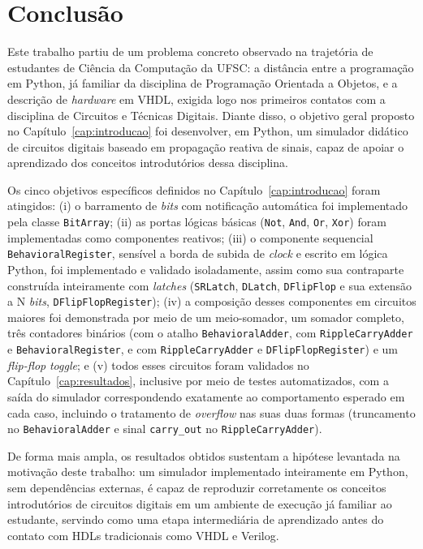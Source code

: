 \chapter{Conclusão}
\label{cap:conclusao}

Este trabalho partiu de um problema concreto observado na trajetória de estudantes de Ciência da Computação da UFSC: a distância entre a programação em Python, já familiar da disciplina de Programação Orientada a Objetos, e a descrição de \textit{hardware} em VHDL, exigida logo nos primeiros contatos com a disciplina de Circuitos e Técnicas Digitais. Diante disso, o objetivo geral proposto no Capítulo~\ref{cap:introducao} foi desenvolver, em Python, um simulador didático de circuitos digitais baseado em propagação reativa de sinais, capaz de apoiar o aprendizado dos conceitos introdutórios dessa disciplina.

Os cinco objetivos específicos definidos no Capítulo~\ref{cap:introducao} foram atingidos: (i) o barramento de \textit{bits} com notificação automática foi implementado pela classe \texttt{BitArray}; (ii) as portas lógicas básicas (\texttt{Not}, \texttt{And}, \texttt{Or}, \texttt{Xor}) foram implementadas como componentes reativos; (iii) o componente sequencial \texttt{BehavioralRegister}, sensível a borda de subida de \textit{clock} e escrito em lógica Python, foi implementado e validado isoladamente, assim como sua contraparte construída inteiramente com \textit{latches} (\texttt{SRLatch}, \texttt{DLatch}, \texttt{DFlipFlop} e sua extensão a N \textit{bits}, \texttt{DFlipFlopRegister}); (iv) a composição desses componentes em circuitos maiores foi demonstrada por meio de um meio-somador, um somador completo, três contadores binários (com o atalho \texttt{BehavioralAdder}, com \texttt{RippleCarryAdder} e \texttt{BehavioralRegister}, e com \texttt{RippleCarryAdder} e \texttt{DFlipFlopRegister}) e um \textit{flip-flop} \textit{toggle}; e (v) todos esses circuitos foram validados no Capítulo~\ref{cap:resultados}, inclusive por meio de testes automatizados, com a saída do simulador correspondendo exatamente ao comportamento esperado em cada caso, incluindo o tratamento de \textit{overflow} nas suas duas formas (truncamento no \texttt{BehavioralAdder} e sinal \texttt{carry\_out} no \texttt{RippleCarryAdder}).

De forma mais ampla, os resultados obtidos sustentam a hipótese levantada na motivação deste trabalho: um simulador implementado inteiramente em Python, sem dependências externas, é capaz de reproduzir corretamente os conceitos introdutórios de circuitos digitais em um ambiente de execução já familiar ao estudante, servindo como uma etapa intermediária de aprendizado antes do contato com HDLs tradicionais como VHDL e Verilog.

